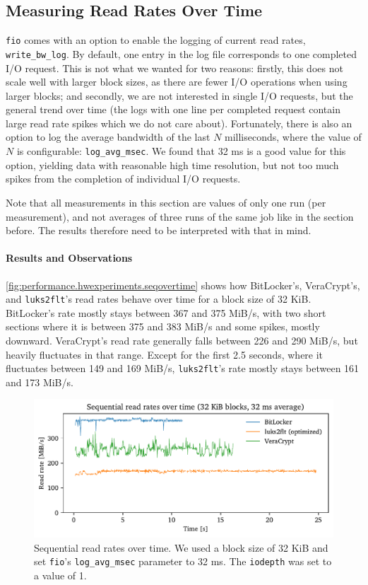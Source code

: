 \subsection{Measuring Read Rates Over Time}
\label{chap:performance.hwexperiments.readrateovertime}
\texttt{fio} comes with an option to enable the logging of current read rates, \texttt{write\_bw\_log}. By default, one entry in the log file corresponds to one completed I/O request. This is not what we wanted for two reasons: firstly, this does not scale well with larger block sizes, as there are fewer I/O operations when using larger blocks; and secondly, we are not interested in single I/O requests, but the general trend over time (the logs with one line per completed request contain large read rate spikes which we do not care about). Fortunately, there is also an option to log the average bandwidth of the last $N$ milliseconds, where the value of $N$ is configurable: \texttt{log\_avg\_msec}. We found that 32 ms is a good value for this option, yielding data with reasonable high time resolution, but not too much spikes from the completion of individual I/O requests.

Note that all measurements in this section are values of only one run (per measurement), and not averages of three runs of the same job like in the section before. The results therefore need to be interpreted with that in mind.

\paragraph{Results and Observations}
\autoref{fig:performance.hwexperiments.seqovertime} shows how BitLocker's, VeraCrypt's, and \texttt{luks2flt}'s read rates behave over time for a block size of 32 KiB. BitLocker's rate mostly stays between 367 and 375 MiB/s, with two short sections where it is between 375 and 383 MiB/s and some spikes, mostly downward. VeraCrypt's read rate generally falls between 226 and 290 MiB/s, but heavily fluctuates in that range. Except for the first 2.5 seconds, where it fluctuates between 149 and 169 MiB/s, \texttt{luks2flt}'s rate mostly stays between 161 and 173 MiB/s.

\begin{figure}[htb!]
	\center
	\includegraphics[scale=1]{../fig/performance.hwexperiments.seqovertime.pdf}
	\caption[
		Sequential read rates over time
	]{
		Sequential read rates over time. We used a block size of 32 KiB and set \texttt{fio}'s \texttt{log\_avg\_msec} parameter to 32 ms. The \texttt{iodepth} was set to a value of 1.
	}
	\label{fig:performance.hwexperiments.seqovertime}
\end{figure}

